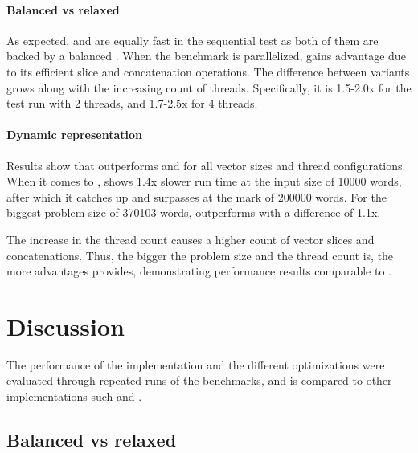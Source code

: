 \paragraph{Balanced vs relaxed}
As expected, \rbvec{} and \rrbvec{} are equally fast in the sequential test as both of them are backed by a balanced \rbtree{}. When the benchmark is parallelized, \rrbvec{} gains advantage due to its efficient slice and concatenation operations. The difference between variants grows along with the increasing count of threads. Specifically, it is 1.5-2.0x for the test run with 2 threads, and 1.7-2.5x for 4 threads.

\paragraph{Dynamic representation}
Results show that \pvec{} outperforms \rbvec{} and \rrbvec{} for all vector sizes and thread configurations. When it comes to \stdvec{}, \pvec{} shows 1.4x slower run time at the input size of 10000 words, after which it catches up and surpasses \stdvec{} at the mark of 200000 words. For the biggest problem size of 370103 words, \pvec{} outperforms \stdvec{} with a difference of 1.1x. 

The increase in the thread count causes a higher count of vector slices and concatenations. Thus, the bigger the problem size and the thread count is, the more advantages \pvec{} provides, demonstrating performance results comparable to \stdvec{}. 

\section{Discussion}
The performance of the \rrbvec{} implementation and the different optimizations were evaluated through repeated runs of the benchmarks, and is compared to other implementations such \stdvec{} and \imrsvec{}. 



\subsection{Balanced vs relaxed}

